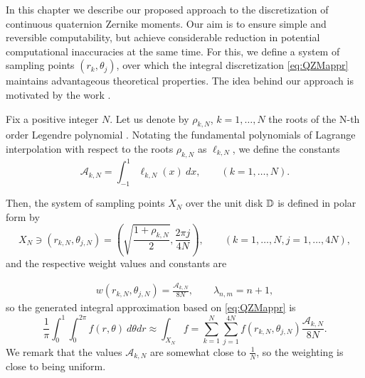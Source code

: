 In this chapter we describe our proposed approach to the discretization of continuous quaternion Zernike moments. Our aim is to ensure simple and reversible computability, but achieve considerable reduction in potential computational inaccuracies at the same time. For this, we define a system of sampling points $(r_k,\theta_j)$, over which the integral discretization \eqref{eq:QZMappr} maintains advantageous theoretical properties. The idea behind our approach is motivated by the work \cite{schipp}.

Fix a positive integer $N$. Let us denote by $\rho_{k,N}$, $k=1,\ldots,N$ the roots of the N-th order Legendre polynomial \cite{Szego}. Notating the fundamental polynomials of Lagrange interpolation with respect to the roots $\rho_{k,N}$ as $\ell_{k,N}$, we define the constants
\[
	\mathcal{A}_{k,N} = \int_{-1}^{1} \ell_{k,N}(x)\ dx, \qquad (k=1,\ldots,N).
\]

Then, the system of sampling points $X_N$ over the unit disk $\mathbb{D}$ is defined in polar form by
\[
	X_N\ni (r_{k,N}, \theta_{j,N}) = \left(\sqrt{\frac{1+\rho_{k,N}}{2}} , \frac{2\pi j}{4N} \right), \qquad (k=1,\ldots,N,j=1,\ldots,4N),
\]
and the respective weight values and constants are

\begin{gather}
	w(r_{k,N},\theta_{j,N}) = \frac{\mathcal{A}_{k,N}}{8N},\qquad \lambda_{n,m} = n+1,
	\label{weight}
\end{gather}
so the generated integral approximation based on \eqref{eq:QZMappr} is
\[
	\frac{1}{\pi} \int_{0}^1 \int_0^{2\pi} f(r,\theta)\ d\theta dr \approx \int_{X_N} f = \sum_{k=1}^{N} \sum_{j=1}^{4N} f(r_{k,N},\theta_{j,N}) \frac{\mathcal{A}_{k,N}}{8N}.
\]
We remark that the values $\mathcal{A}_{k,N}$ are somewhat close to $\frac{1}{N}$, so the weighting is close to being uniform.

